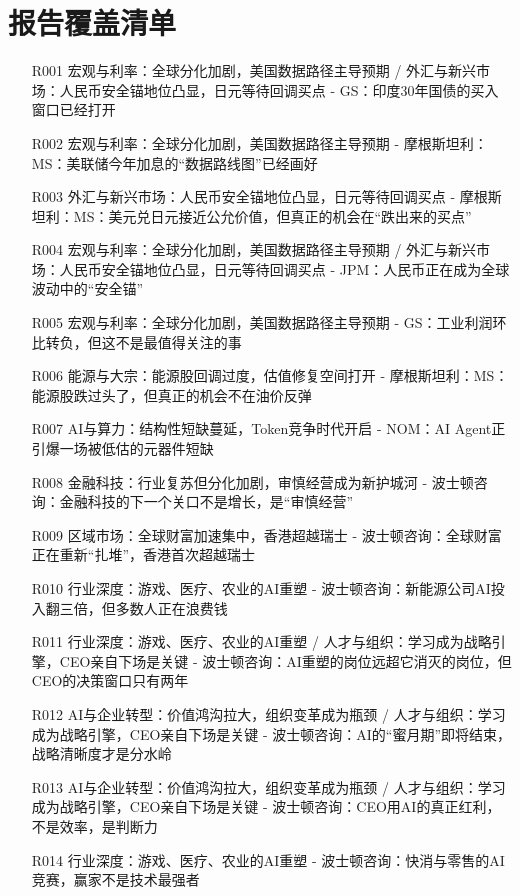 \documentclass[11pt]{ctexart}
\begin{document}
\section{报告覆盖清单}
\begin{itemize}
  \item [R001] 宏观与利率：全球分化加剧，美国数据路径主导预期 / 外汇与新兴市场：人民币安全锚地位凸显，日元等待回调买点 - GS：印度30年国债的买入窗口已经打开
  \item [R002] 宏观与利率：全球分化加剧，美国数据路径主导预期 - 摩根斯坦利：MS：美联储今年加息的“数据路线图”已经画好
  \item [R003] 外汇与新兴市场：人民币安全锚地位凸显，日元等待回调买点 - 摩根斯坦利：MS：美元兑日元接近公允价值，但真正的机会在“跌出来的买点”
  \item [R004] 宏观与利率：全球分化加剧，美国数据路径主导预期 / 外汇与新兴市场：人民币安全锚地位凸显，日元等待回调买点 - JPM：人民币正在成为全球波动中的“安全锚”
  \item [R005] 宏观与利率：全球分化加剧，美国数据路径主导预期 - GS：工业利润环比转负，但这不是最值得关注的事
  \item [R006] 能源与大宗：能源股回调过度，估值修复空间打开 - 摩根斯坦利：MS：能源股跌过头了，但真正的机会不在油价反弹
  \item [R007] AI与算力：结构性短缺蔓延，Token竞争时代开启 - NOM：AI Agent正引爆一场被低估的元器件短缺
  \item [R008] 金融科技：行业复苏但分化加剧，审慎经营成为新护城河 - 波士顿咨询：金融科技的下一个关口不是增长，是“审慎经营”
  \item [R009] 区域市场：全球财富加速集中，香港超越瑞士 - 波士顿咨询：全球财富正在重新“扎堆”，香港首次超越瑞士
  \item [R010] 行业深度：游戏、医疗、农业的AI重塑 - 波士顿咨询：新能源公司AI投入翻三倍，但多数人正在浪费钱
  \item [R011] 行业深度：游戏、医疗、农业的AI重塑 / 人才与组织：学习成为战略引擎，CEO亲自下场是关键 - 波士顿咨询：AI重塑的岗位远超它消灭的岗位，但CEO的决策窗口只有两年
  \item [R012] AI与企业转型：价值鸿沟拉大，组织变革成为瓶颈 / 人才与组织：学习成为战略引擎，CEO亲自下场是关键 - 波士顿咨询：AI的“蜜月期”即将结束，战略清晰度才是分水岭
  \item [R013] AI与企业转型：价值鸿沟拉大，组织变革成为瓶颈 / 人才与组织：学习成为战略引擎，CEO亲自下场是关键 - 波士顿咨询：CEO用AI的真正红利，不是效率，是判断力
  \item [R014] 行业深度：游戏、医疗、农业的AI重塑 - 波士顿咨询：快消与零售的AI竞赛，赢家不是技术最强者

\end{itemize}
\end{document}
